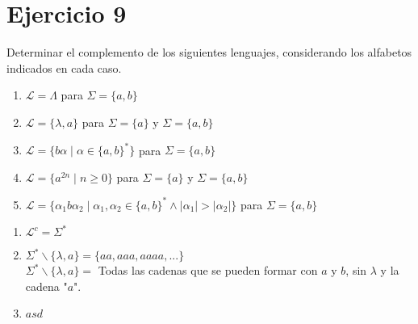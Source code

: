 \documentclass[12pt]{article}
\begin{document}
\section*{Ejercicio 9}
Determinar el complemento de los siguientes lenguajes, considerando los alfabetos indicados en cada caso.
\begin{enumerate}[label=\Roman*.]
    \item $\mathcal{L} = \Lambda$ para $\Sigma = \{a, b\}$
    \item $\mathcal{L} = \{\lambda, a\}$ para $\Sigma = \{a\}$ y $\Sigma = \{a, b\}$
    \item $\mathcal{L} = \{b\alpha \mid \alpha \in \{a, b\}^*\}$ para $\Sigma = \{a, b\}$
    \item $\mathcal{L} = \{a^{2n} \mid n \geq 0\}$ para $\Sigma = \{a\}$ y $\Sigma = \{a, b\}$
    \item $\mathcal{L} = \{\alpha_1 b \alpha_2 \mid \alpha_1, \alpha_2 \in \{a, b\}^* \land |\alpha_1| > |\alpha_2|\}$ para $\Sigma = \{a, b\}$
\end{enumerate}
\begin{enumerate}[label=\roman*.,font=\itshape]
    \item $\mathcal{L}^c = \Sigma^*$
    \item $\Sigma^* \backslash \{\lambda,a\} = \{aa,aaa,aaaa,...\}$ \\
          $\Sigma^* \backslash \{\lambda, a\} =$ Todas las cadenas que se pueden formar con $a$ y $b$, sin $\lambda$ y la cadena "$a$".
    \item $asd$
\end{enumerate}
\end{document}
